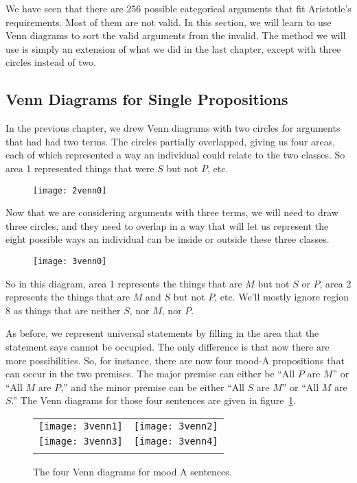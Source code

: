 We have seen that there are 256 possible categorical arguments that fit Aristotle's requirements. Most of them are not valid. In this section, we will learn to use Venn diagrams to sort the valid arguments from the invalid. The method we will use is simply an extension of what we did in the last chapter, except with three circles instead of two.

\subsection{Venn Diagrams for Single Propositions}

In the previous chapter, we drew Venn diagrams with two circles for arguments that had had two terms. The circles partially overlapped, giving us four areas, each of which represented a way an individual could relate to the two classes. So area 1 represented things that were $S$ but not $P$, etc.

\begin{figure}
\centering
\texttt{[image: 2venn0]}
\end{figure}

Now that we are considering arguments with three terms, we will need to draw three circles, and they need to overlap in a way that will let us represent the eight possible ways an individual can be inside or outside these three classes.

\begin{figure}
\centering
    \texttt{[image: 3venn0]}
\end{figure}

So in this diagram, area 1 represents the things that are $M$ but not $S$ or $P$, area 2 represents the things that are $M$ and $S$ but not $P$, etc. We'll mostly ignore region 8 as things that are neither $S$, nor $M$, nor $P$.

As before, we represent universal statements by filling in the area that the statement says cannot be occupied. The only difference is that now there are more possibilities. So, for instance, there are now four mood-A propositions that can occur in the two premises. The major premise can either be ``All $P$ are $M$'' or ``All $M$ are $P$,'' and the minor premise can be either ``All $S$ are $M$'' or ``All $M$ are $S$.'' The Venn diagrams for those four sentences are given in figure~\ref{fig:mood-A_venns}.

\begin{figure}
\begin{tabu}{X[1,c] X[1,c]}
\texttt{[image: 3venn1]} &
\texttt{[image: 3venn2]} \\
\texttt{[image: 3venn3]} &
\texttt{[image: 3venn4]} \\
\caption{The four Venn diagrams for mood A sentences.}
\label{fig:mood-A_venns}
\end{tabu}
\end{figure}

